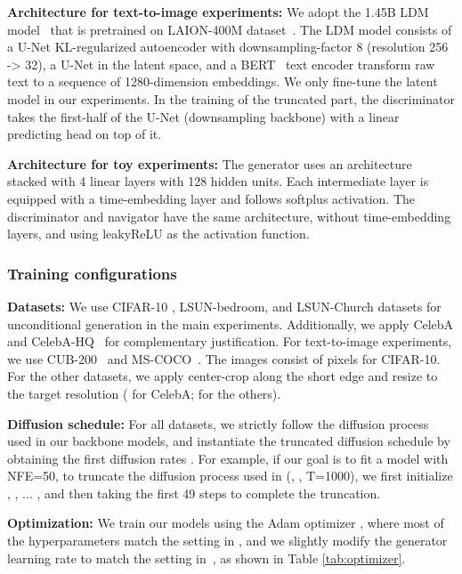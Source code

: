 \documentclass{article} \usepackage{iclr2023_conference,times}
\theoremstyle{plain}
\theoremstyle{definition}
\theoremstyle{remark}
\begin{document}
{\textbf{Architecture for text-to-image experiments:} We adopt the 1.45B LDM model~\citep{rombach2022high} that is pretrained on LAION-400M dataset~\citep{laion}. The LDM model consists of a U-Net KL-regularized autoencoder with downsampling-factor 8 (resolution 256 -> 32), a U-Net in the latent space, and a BERT~\citep{devlin2018bert} text encoder transform raw text to a sequence of 1280-dimension embeddings. We only fine-tune the latent model in our experiments. 
In the training of the truncated part, the discriminator takes the first-half of the U-Net (downsampling backbone) with a linear predicting head on top of it.

\textbf{Architecture for toy experiments:} The generator uses an architecture stacked with 4 linear layers with 128 hidden units. Each intermediate layer is equipped with a time-embedding layer and follows softplus activation. The discriminator and navigator have the same architecture, without time-embedding layers, and using leakyReLU as the activation function.
 
\subsubsection{Training configurations}
\textbf{Datasets:} We use CIFAR-10 \citep{cifar10}, LSUN-bedroom, and LSUN-Church \citep{lsun} datasets for unconditional generation in the main experiments. Additionally, we apply CelebA\citep{celeba} and CelebA-HQ~\citep{CelebAMask-HQ} for complementary justification. For text-to-image experiments, we use CUB-200~\citep{cub} and MS-COCO~\citep{mscoco}. The images consist of  pixels for CIFAR-10. For the other datasets, we apply center-crop along the short edge and resize to the target resolution ( for CelebA;  for the others). 

\textbf{Diffusion schedule:} For all datasets, we strictly follow the diffusion process used in our backbone models, and instantiate the truncated diffusion schedule by obtaining the first  diffusion rates . For example, if our goal is to fit a model with NFE=50, to truncate the diffusion process used in \citet{ddpm} (, , T=1000), we first initialize , , ... , and then taking the first 49 steps to complete the truncation. 

\textbf{Optimization:} We train our models using the Adam optimizer \citep{adam}, where most of the hyperparameters match the setting in \citet{xiao2021tackling}, and we slightly modify the generator learning rate to match the setting in~\citet{ddpm}, as shown in Table \ref{tab:optimizer}. 

}
\end{document}

